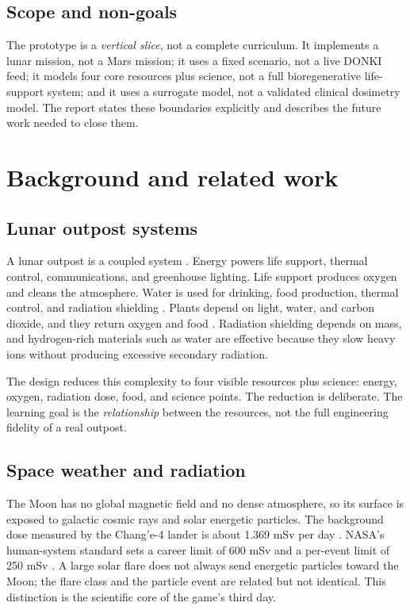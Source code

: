 \documentclass[11pt,a4paper]{article}
\begin{document}
\subsection{Scope and non-goals}

The prototype is a \emph{vertical slice}, not a complete curriculum. It implements a lunar mission, not a Mars mission; it uses a fixed scenario, not a live DONKI feed; it models four core resources plus science, not a full bioregenerative life-support system; and it uses a surrogate model, not a validated clinical dosimetry model. The report states these boundaries explicitly and describes the future work needed to close them.

\section{Background and related work}

\subsection{Lunar outpost systems}

A lunar outpost is a coupled system \cite{heiken1991,anderson2018}. Energy powers life support, thermal control, communications, and greenhouse lighting. Life support produces oxygen and cleans the atmosphere. Water is used for drinking, food production, thermal control, and radiation shielding \cite{wilson1997}. Plants depend on light, water, and carbon dioxide, and they return oxygen and food \cite{wheeler2017}. Radiation shielding depends on mass, and hydrogen-rich materials such as water are effective because they slow heavy ions without producing excessive secondary radiation.

The design reduces this complexity to four visible resources plus science: energy, oxygen, radiation dose, food, and science points. The reduction is deliberate. The learning goal is the \emph{relationship} between the resources, not the full engineering fidelity of a real outpost.

\subsection{Space weather and radiation}

The Moon has no global magnetic field and no dense atmosphere, so its surface is exposed to galactic cosmic rays and solar energetic particles. The background dose measured by the Chang'e-4 lander is about 1.369 mSv per day \cite{zhang2020}. NASA's human-system standard sets a career limit of 600 mSv and a per-event limit of 250 mSv \cite{nasa3001}. A large solar flare does not always send energetic particles toward the Moon; the flare class and the particle event are related but not identical. This distinction is the scientific core of the game's third day.
\end{document}
